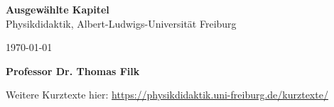 \begin{titlepage}
       \begin{center}
              \vspace{-1cm}
              \Huge
              \textbf{Ausgewählte Kapitel} \\
              \vspace{1cm}
              \Large{Physikdidaktik, Albert-Ludwigs-Universität Freiburg}
              \vspace{1cm}
              \normalsize
              \vspace{0.5cm}
              
              \today
                     
              \vspace{1.5cm}

              \textbf{Professor Dr. Thomas Filk}

              \vfill
                     
                     
              \vspace{0.8cm}
              
                     
              Weitere Kurztexte hier: \url{https://physikdidaktik.uni-freiburg.de/kurztexte/}
                     
       \end{center}
\end{titlepage}

